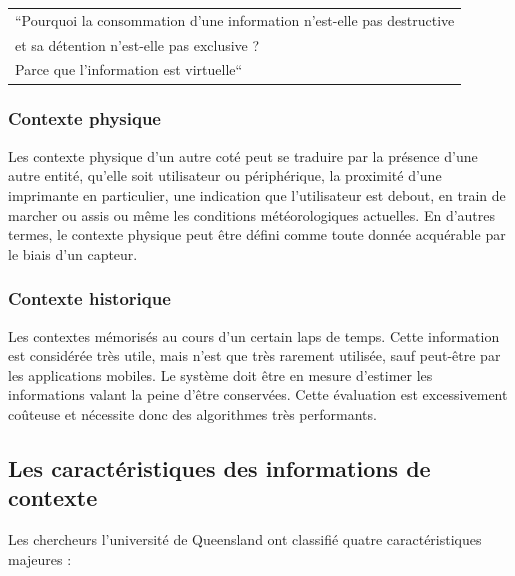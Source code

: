{%
    \centering
    \begin{tabular}{l}
        ``Pourquoi la consommation d'une information n'est-elle pas destructive
        \\ et sa détention n'est-elle pas exclusive ? \\ 
        Parce que l'information est virtuelle``
        \cite{levy_quest_2010} \\
    \end{tabular}
}%

\subsubsection{Contexte physique}

Les contexte physique d'un autre coté peut se traduire par la présence d'une
autre entité, qu'elle soit utilisateur ou périphérique, la proximité d'une
imprimante en particulier, une indication que l'utilisateur est debout, en train
de marcher ou assis ou même les conditions météorologiques actuelles. En d'autres
termes, le contexte physique peut être défini comme toute donnée acquérable par
le biais d'un capteur.

\subsubsection{Contexte historique}

Les contextes mémorisés au cours d'un certain laps de temps. Cette information
est considérée très utile, mais n'est que très rarement utilisée, sauf peut-être
par les applications mobiles. Le système doit être en mesure d'estimer les
informations valant la peine d'être conservées. Cette évaluation est
excessivement coûteuse et nécessite donc des algorithmes très performants.

\subsection{Les caractéristiques des informations de contexte}

Les chercheurs l'université de Queensland ont classifié quatre caractéristiques
majeures : \cite{catharina_context_2002}

